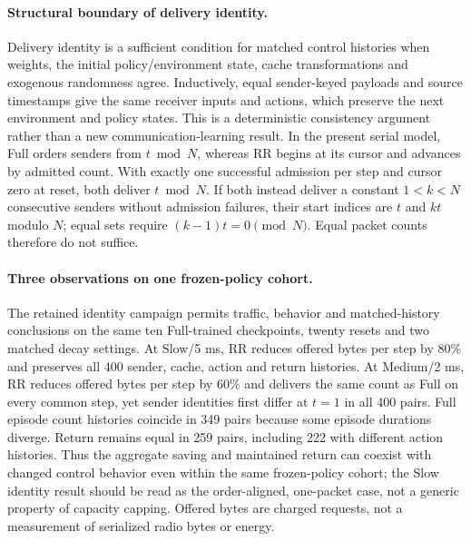 \paragraph{Structural boundary of delivery identity.}
Delivery identity is a sufficient condition for matched control histories when weights, the initial policy/environment state, cache transformations and exogenous randomness agree. Inductively, equal sender-keyed payloads and source timestamps give the same receiver inputs and actions, which preserve the next environment and policy states. This is a deterministic consistency argument rather than a new communication-learning result. In the present serial model, Full orders senders from $t\bmod N$, whereas RR begins at its cursor and advances by admitted count. With exactly one successful admission per step and cursor zero at reset, both deliver $t\bmod N$. If both instead deliver a constant $1<k<N$ consecutive senders without admission failures, their start indices are $t$ and $kt$ modulo $N$; equal sets require $(k-1)t=0\pmod N$. Equal packet counts therefore do not suffice.

\paragraph{Three observations on one frozen-policy cohort.}
The retained identity campaign permits traffic, behavior and matched-history conclusions on the same ten Full-trained checkpoints, twenty resets and two matched decay settings. At Slow/5 ms, RR reduces offered bytes per step by 80\% and preserves all 400 sender, cache, action and return histories. At Medium/2 ms, RR reduces offered bytes per step by 60\% and delivers the same count as Full on every common step, yet sender identities first differ at $t=1$ in all 400 pairs. Full episode count histories coincide in 349 pairs because some episode durations diverge. Return remains equal in 259 pairs, including 222 with different action histories. Thus the aggregate saving and maintained return can coexist with changed control behavior even within the same frozen-policy cohort; the Slow identity result should be read as the order-aligned, one-packet case, not a generic property of capacity capping. Offered bytes are charged requests, not a measurement of serialized radio bytes or energy.

